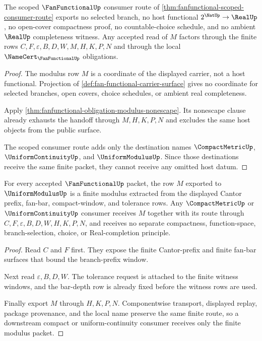 \begin{theorem}
\label{thm:fanfunctional-scoped-choice-nonescape}
The scoped $\FanFunctionalUp$ consumer route of \autoref{thm:fanfunctional-scoped-consumer-route} exports no selected branch, no host functional $2^{\NatUp}\to\RealUp$, no open-cover compactness proof, no countable-choice schedule, and no ambient $\RealUp$ completeness witness. Any accepted read of $M$ factors through the finite rows $C,F,\varepsilon,B,D,W,M,H,K,P,N$ and through the local $\NameCert_{\FanFunctionalUp}$ obligations.
\end{theorem}
\begin{proof}
The modulus row $M$ is a coordinate of the displayed carrier, not a host functional. Projection of \autoref{def:fan-functional-carrier-surface} gives no coordinate for selected branches, open covers, choice schedules, or ambient real completeness.

Apply \autoref{thm:fanfunctional-obligation-modulus-nonescape}. Its nonescape clause already exhausts the handoff through $M,H,K,P,N$ and excludes the same host objects from the public surface.

The scoped consumer route adds only the destination names $\CompactMetricUp$, $\UniformContinuityUp$, and $\UniformModulusUp$. Since those destinations receive the same finite packet, they cannot receive any omitted host datum.
\end{proof}

\begin{theorem}
\label{thm:fanfunctional-scoped-finite-modulus-export}
For every accepted $\FanFunctionalUp$ packet, the row $M$ exported to $\UniformModulusUp$ is a finite modulus extracted from the displayed Cantor prefix, fan-bar, compact-window, and tolerance rows. Any $\CompactMetricUp$ or $\UniformContinuityUp$ consumer receives $M$ together with its route through $C,F,\varepsilon,B,D,W,H,K,P,N$, and receives no separate compactness, function-space, branch-selection, choice, or Real-completion principle.
\end{theorem}
\begin{proof}
Read $C$ and $F$ first. They expose the finite Cantor-prefix and finite fan-bar surfaces that bound the branch-prefix window.

Next read $\varepsilon,B,D,W$. The tolerance request is attached to the finite witness windows, and the bar-depth row is already fixed before the witness rows are used.

Finally export $M$ through $H,K,P,N$. Componentwise transport, displayed replay, package provenance, and the local name preserve the same finite route, so a downstream compact or uniform-continuity consumer receives only the finite modulus packet.
\end{proof}

